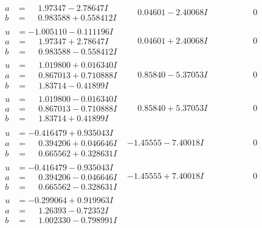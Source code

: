 \documentclass[1p]{elsarticle_modified}
\theoremstyle{definition}
\begin{document}
$$\begin{array}{c|c|c}
\begin{aligned}
a &= \phantom{-}1.97347 - 2.78647 I \\
b &= \phantom{-}0.983588 + 0.558412 I\end{aligned}
 & \phantom{-}0.04601 - 2.40068 I & \phantom{-0.000000 } 0 \\ \hline\begin{aligned}
u &= -1.005110 - 0.111196 I \\
a &= \phantom{-}1.97347 + 2.78647 I \\
b &= \phantom{-}0.983588 - 0.558412 I\end{aligned}
 & \phantom{-}0.04601 + 2.40068 I & \phantom{-0.000000 } 0 \\ \hline\begin{aligned}
u &= \phantom{-}1.019800 + 0.016340 I \\
a &= \phantom{-}0.867013 + 0.710888 I \\
b &= \phantom{-}1.83714 - 0.41899 I\end{aligned}
 & \phantom{-}0.85840 - 5.37053 I & \phantom{-0.000000 } 0 \\ \hline\begin{aligned}
u &= \phantom{-}1.019800 - 0.016340 I \\
a &= \phantom{-}0.867013 - 0.710888 I \\
b &= \phantom{-}1.83714 + 0.41899 I\end{aligned}
 & \phantom{-}0.85840 + 5.37053 I & \phantom{-0.000000 } 0 \\ \hline\begin{aligned}
u &= -0.416479 + 0.935043 I \\
a &= \phantom{-}0.394206 + 0.046646 I \\
b &= \phantom{-}0.665562 + 0.328631 I\end{aligned}
 & -1.45555 - 7.40018 I & \phantom{-0.000000 } 0 \\ \hline\begin{aligned}
u &= -0.416479 - 0.935043 I \\
a &= \phantom{-}0.394206 - 0.046646 I \\
b &= \phantom{-}0.665562 - 0.328631 I\end{aligned}
 & -1.45555 + 7.40018 I & \phantom{-0.000000 } 0 \\ \hline\begin{aligned}
u &= -0.299064 + 0.919963 I \\
a &= \phantom{-}1.26393 - 0.72352 I \\
b &= \phantom{-}1.002330 - 0.798991 I\end{aligned}

\end{array}$$
\end{document}
